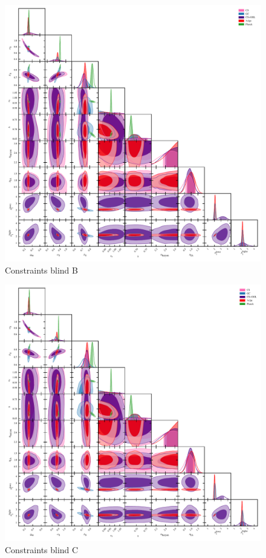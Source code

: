 \begin{figure}
	\begin{center}
		\includegraphics[width=\textwidth]{Parameter_Plots/cosmology/omegam_sigma8_s8_ns_h_a_baryon_a_ia_b1l_b1h_blind_B}
		\caption{Constraints blind B}
		\label{fig:cosmology-params-allB}
	\end{center}
\end{figure}

\begin{figure}
	\begin{center}
		\includegraphics[width=\textwidth]{Parameter_Plots/cosmology/omegam_sigma8_s8_ns_h_a_baryon_a_ia_b1l_b1h_blind_C}
		\caption{Constraints blind C}
		\label{fig:cosmology-params-allC}
	\end{center}
\end{figure}


